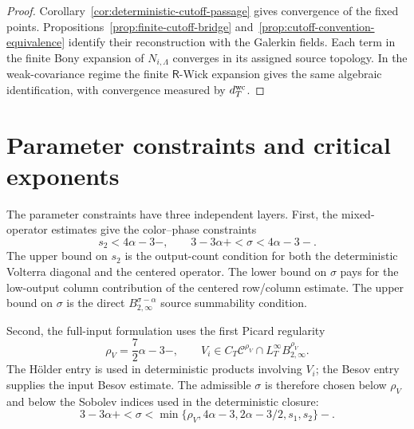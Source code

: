 \documentclass[10pt]{amsart}
\numberwithin{equation}{section}
\theoremstyle{plain}
\theoremstyle{definition}
\theoremstyle{remark}
\begin{document}
\begin{proof}
Corollary~\ref{cor:deterministic-cutoff-passage} gives convergence of the fixed points.  Propositions~\ref{prop:finite-cutoff-bridge} and~\ref{prop:cutoff-convention-equivalence} identify their reconstruction with the Galerkin fields.  Each term in the finite Bony expansion of \(N_{i,\Lambda}\) converges in its assigned source topology.  In the weak-covariance regime the finite \(\mathsf R\)-Wick expansion gives the same algebraic identification, with convergence measured by \(d_T^{\rm wc}\).
\end{proof}

\section{Parameter constraints and critical exponents}\label{sec:parameters}

The parameter constraints have three independent layers.  First, the mixed-operator estimates give the color--phase constraints
\begin{equation}\label{eq:operator-cond-constraints}
        s_2<4\alpha-3-,\qquad 3-3\alpha+<\sigma<4\alpha-3-.
\end{equation}
The upper bound on $s_2$ is the output-count condition for both the deterministic Volterra diagonal and the centered operator.  The lower bound on $\sigma$ pays for the low-output column contribution of the centered row/column estimate.  The upper bound on $\sigma$ is the direct $B_{2,\infty}^{\sigma-\alpha}$ source summability condition.

Second, the full-input formulation uses the first Picard regularity
\begin{equation}\label{eq:Vi-regularity-constraints}
        \rho_V=\frac72\alpha-3- ,
        \qquad
        V_i\in C_T\mathcal C^{\rho_V}\cap L_T^\infty B_{2,\infty}^{\rho_V}.
\end{equation}
The H\"older entry is used in deterministic products involving $V_i$; the Besov entry supplies the input Besov estimate.  The admissible $\sigma$ is therefore chosen below $\rho_V$ and below the Sobolev indices used in the deterministic closure:
\begin{equation}\label{eq:combined-sigma-table}
        3-3\alpha+<\sigma<\min\{\rho_V,4\alpha-3,2\alpha-3/2,s_1,s_2\}-.
\end{equation}
\end{document}
